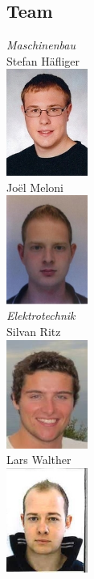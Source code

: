 \subsection{Team}

\begin{minipage}{0.4\textwidth}
\begin{flushleft} \large
\emph{Maschinenbau}\\
Stefan Häfliger\\
\includegraphics[width=0.2\textwidth]{./04_Projektmanagement/fig/stefanhaefliger.jpg}\\
Joël Meloni\\
\includegraphics[width=0.2\textwidth]{./04_Projektmanagement/fig/joelmeloni.jpg}\\
\emph{Elektrotechnik}\\
Silvan Ritz\\
\includegraphics[width=0.2\textwidth]{./04_Projektmanagement/fig/silvanritz.jpg}\\
Lars Walther\\
\includegraphics[width=0.2\textwidth]{./04_Projektmanagement/fig/larswalther.jpg}\\
\end{flushleft}
\end{minipage}
